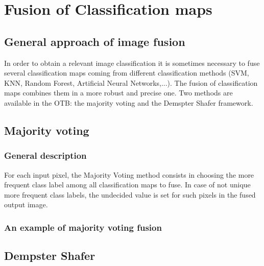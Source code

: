 \ifitkFullVersion

\fi

\ifitkFullVersion

\fi

\section{Fusion of Classification maps}

\subsection{General approach of image fusion}
In order to obtain a relevant image classification it is sometimes necessary to 
fuse several classification maps coming from different classification methods 
(SVM, KNN, Random Forest, Artificial Neural Networks,...). The fusion of 
classification maps combines them in a more robust and precise one. Two methods are 
available in the OTB: the majority voting and the Demspter Shafer framework.

\subsection{Majority voting}
\subsubsection{General description}
For each input pixel, the Majority Voting method consists in choosing the more 
frequent class label among all classification maps to fuse. In case of not unique 
more frequent class labels, the undecided value is set for such pixels in 
the fused output image.

\subsubsection{An example of majority voting fusion}
\ifitkFullVersion

\fi

\subsection{Dempster Shafer}

